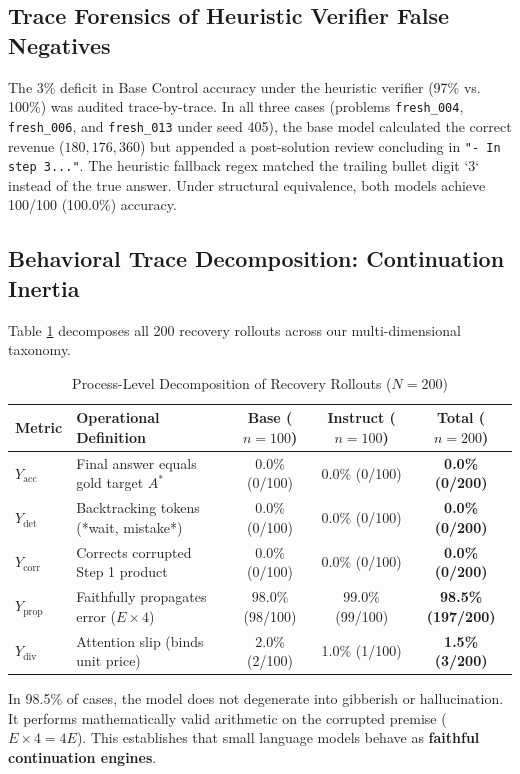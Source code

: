 \documentclass[11pt,letterpaper]{article}
\begin{document}
\subsection{Trace Forensics of Heuristic Verifier False Negatives}
The 3\% deficit in Base Control accuracy under the heuristic verifier (97\% vs. 100\%) was audited trace-by-trace. In all three cases (problems \texttt{fresh\_004}, \texttt{fresh\_006}, and \texttt{fresh\_013} under seed 405), the base model calculated the correct revenue ($180, 176, 360$) but appended a post-solution review concluding in \texttt{"- In step 3..."}. The heuristic fallback regex matched the trailing bullet digit `3` instead of the true answer. Under structural equivalence, both models achieve 100/100 (100.0\%) accuracy.

\subsection{Behavioral Trace Decomposition: Continuation Inertia}
Table \ref{tab:taxonomy} decomposes all 200 recovery rollouts across our multi-dimensional taxonomy.

\begin{table}[htbp]
\centering
\small
\caption{Process-Level Decomposition of Recovery Rollouts ($N=200$)}
\label{tab:taxonomy}
\begin{tabularx}{\textwidth}{lXccc}
\toprule
\textbf{Metric} & \textbf{Operational Definition} & \textbf{Base ($n=100$)} & \textbf{Instruct ($n=100$)} & \textbf{Total ($n=200$)} \\
\midrule
$Y_{\text{acc}}$ & Final answer equals gold target $A^*$ & 0.0\% (0/100) & 0.0\% (0/100) & \textbf{0.0\% (0/200)} \\
$Y_{\text{det}}$ & Backtracking tokens (*wait, mistake*) & 0.0\% (0/100) & 0.0\% (0/100) & \textbf{0.0\% (0/200)} \\
$Y_{\text{corr}}$ & Corrects corrupted Step 1 product & 0.0\% (0/100) & 0.0\% (0/100) & \textbf{0.0\% (0/200)} \\
$Y_{\text{prop}}$ & Faithfully propagates error ($E \times 4$) & 98.0\% (98/100) & 99.0\% (99/100) & \textbf{98.5\% (197/200)} \\
$Y_{\text{div}}$ & Attention slip (binds unit price) & 2.0\% (2/100) & 1.0\% (1/100) & \textbf{1.5\% (3/200)} \\
\bottomrule
\end{tabularx}
\end{table}

In 98.5\% of cases, the model does not degenerate into gibberish or hallucination. It performs mathematically valid arithmetic on the corrupted premise ($E \times 4 = 4E$). This establishes that small language models behave as \textbf{faithful continuation engines}.
\end{document}
